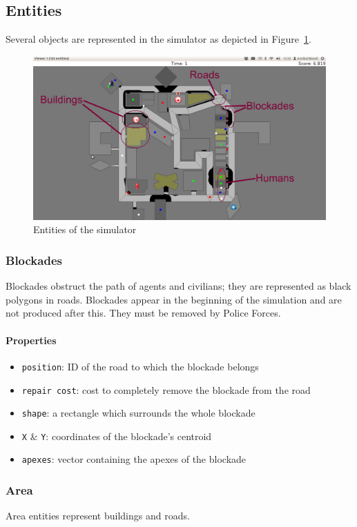 \documentclass{article}
\begin{document}
\subsection{Entities}
Several objects are represented in the simulator as depicted in Figure~\ref{fig:entities}.
\begin{figure}[ht]
  \centering
  \includegraphics[width=1.0\textwidth]{figs/entities}
  \caption{Entities of the simulator}
  \label{fig:entities}
\end{figure}
\subsubsection{Blockades}
Blockades obstruct the path of agents and civilians; they are represented as black polygons in roads. Blockades appear in the beginning of the simulation and are not produced after this. They must be removed by Police Forces.

\paragraph{Properties}
\begin{itemize}
  \item \texttt{position}: ID of the road to which the blockade belongs
  \item \texttt{repair cost}: cost to completely remove the blockade from the road
  \item \texttt{shape}: a rectangle which surrounds the whole blockade
  \item \texttt{X} \& \texttt{Y}: coordinates of the blockade's centroid
  \item \texttt{apexes}: vector containing the apexes of the blockade
\end{itemize}
\subsubsection{Area}
Area entities represent buildings and roads.
\end{document}
